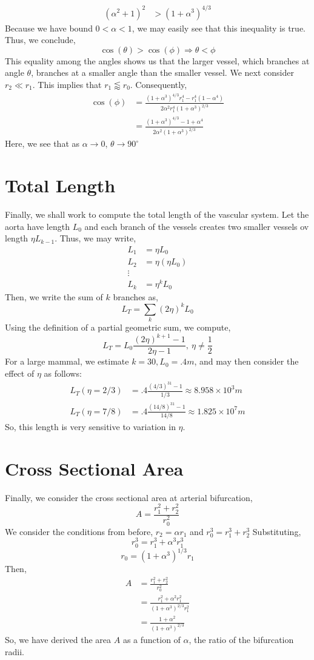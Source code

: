 \documentclass[letterpaper,10pt]{article}
\begin{document}
\begin{align*}
(\alpha^2+1)^2 &> (1+\alpha^3)^{4/3}
\end{align*}
Because we have bound $0<\alpha<1$, we may easily see that this inequality is true. Thus, we conclude,
\[\cos(\theta)>\cos(\phi) \Rightarrow \theta < \phi\]
This equality among the angles shows us that the larger vessel, which branches at angle $\theta$, branches at a smaller angle than the smaller vessel. We next consider $r_2\ll r_1$. This implies that $r_1\lessapprox r_0$. Consequently,
\begin{align*}
\cos(\phi)&=\frac{(1+\alpha^3)^{4/3}r_1^4-r_1^4(1-\alpha^4)}{2\alpha^2r_1^4(1+\alpha^3)^{2/3}}\\
&=\frac{(1+\alpha^3)^{4/3}-1+\alpha^4}{2\alpha^2(1+\alpha^3)^{2/3}}
\end{align*}
Here, we see that as $\alpha\to 0$, $\theta\to 90^{\circ}$ 
\section*{Total Length}
Finally, we shall work to compute the total length of the vascular system. Let the aorta have length $L_0$ and each branch of the vessels creates two smaller vessels ov length $\eta L_{k-1}$. Thus, we may write,
\begin{align*}
L_1&=\eta L_0\\
L_2&=\eta(\eta L_0)\\
\vdots\\
L_k&=\eta^k L_0
\end{align*}
Then, we write the sum of $k$ branches as,
\[L_T=\sum_k (2\eta)^kL_0\]
Using the definition of a partial geometric sum, we compute,
\[L_T=L_0\frac{(2\eta)^{k+1}-1}{2\eta-1},\ \eta\neq\frac{1}{2}\]
For a large mammal, we estimate $k=30, L_0=.4m$, and may then consider the effect of $\eta$ as follows:
\begin{align*}
L_T(\eta=2/3)&=.4\frac{(4/3)^{31}-1}{1/3}\approx 8.958\times 10^3m\\
L_T(\eta=7/8)&=.4\frac{(14/8)^{31}-1}{14/8}\approx 1.825\times 10^7m
\end{align*}
So, this length is very sensitive to variation in $\eta$.
\section*{Cross Sectional Area}
Finally, we consider the cross sectional area at arterial bifurcation,
\[A=\frac{r_1^2+r_2^2}{r_0^2}\]
We consider the conditions from before, $r_2=\alpha r_1$ and $r_0^3=r_1^3+r_2^3$
Substituting,
\[r_0^3=r_1^3+\alpha^3r_1^3\]
\[r_0=(1+\alpha^3)^{1/3}r_1\]
Then,
\begin{align*}
A&=\frac{r_1^2+r_2^2}{r_0^2}\\
&=\frac{r_1^2+\alpha^2r_1^2}{(1+\alpha^3)^{2/3}r_1^2}\\
&=\frac{1+\alpha^2}{(1+\alpha^3)^{2/3}}
\end{align*}
So, we have derived the area $A$ as a function of $\alpha$, the ratio of the bifurcation radii.
\newpage
\end{document}
